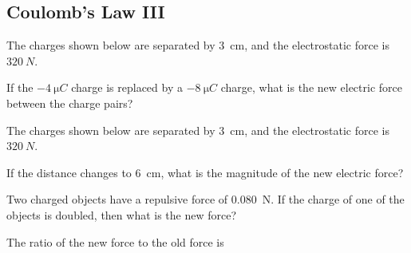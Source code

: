 \documentclass[]{exam}
\begin{document}
\clearpage

\subsection*{Coulomb's Law III} %

\begin{questions}

\question
The charges shown below are separated by \SI{3}{cm}, and the electrostatic force is $\SI{320}{N}$.

\begin{center}
\end{center}

If the $-\SI{4}{\micro C}$ charge is replaced by a $-\SI{8}{\micro C}$ charge, what is the new electric force between the charge pairs?

\question
The charges shown below are separated by \SI{3}{cm}, and the electrostatic force is $\SI{320}{N}$.

\begin{center}
\end{center}

If the distance changes to \SI{6}{cm}, what is the magnitude of the new electric force?

\question
Two charged objects have a repulsive force of \SI{0.080}{N}. If the charge of one of the objects is doubled, then what is the new force?

\begin{solution}
The ratio of the new force to the old force is


\end{solution}
\end{questions}
\end{document}
